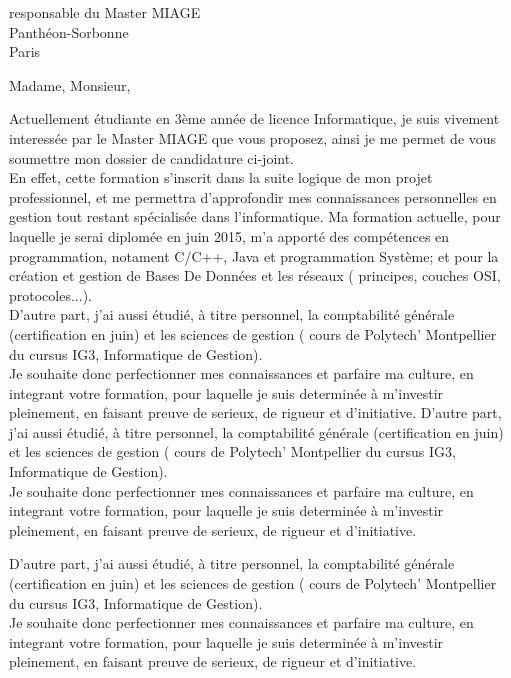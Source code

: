 \documentclass[a4paper]{lettre}
\begin{document}
\begin{letter}{responsable du Master MIAGE\\Panthéon-Sorbonne\\Paris}
\signature{Tamara }
\nofax
{}
\address{Tamara \\64, avenue de Lodève\\34070 Montpellier}
\date{23 sept. 2015}

\opening{Madame, Monsieur,}
Actuellement étudiante en 3ème année de licence Informatique, je suis vivement interessée par le Master MIAGE que vous proposez, ainsi je me permet de vous soumettre mon dossier de candidature ci-joint.\\
En effet, cette formation s'inscrit dans la suite logique de mon projet professionnel, et me permettra d'approfondir mes connaissances personnelles en gestion tout restant spécialisée dans l'informatique.
Ma formation actuelle, pour laquelle je serai diplomée en juin 2015, m'a apporté des compétences en programmation, notament C/C++, Java et programmation Système; et pour la création et gestion de Bases De Données et les réseaux ( principes, couches OSI, protocoles...).\\
D'autre part, j'ai aussi étudié, à titre personnel, la comptabilité générale (certification en juin) et les sciences de gestion ( cours de Polytech' Montpellier du cursus IG3, Informatique de Gestion).\\
Je souhaite donc perfectionner mes connaissances et parfaire ma culture, en integrant votre formation, pour laquelle je suis determinée à m'investir pleinement, en faisant preuve de serieux, de rigueur et d'initiative.
D'autre part, j'ai aussi étudié, à titre personnel, la comptabilité générale (certification en juin) et les sciences de gestion ( cours de Polytech' Montpellier du cursus IG3, Informatique de Gestion).\\
Je souhaite donc perfectionner mes connaissances et parfaire ma culture, en integrant votre formation, pour laquelle je suis determinée à m'investir pleinement, en faisant preuve de serieux, de rigueur et d'initiative.

D'autre part, j'ai aussi étudié, à titre personnel, la comptabilité générale (certification en juin) et les sciences de gestion ( cours de Polytech' Montpellier du cursus IG3, Informatique de Gestion).\\
Je souhaite donc perfectionner mes connaissances et parfaire ma culture, en integrant votre formation, pour laquelle je suis determinée à m'investir pleinement, en faisant preuve de serieux, de rigueur et d'initiative.


\end{letter}
\end{document}
